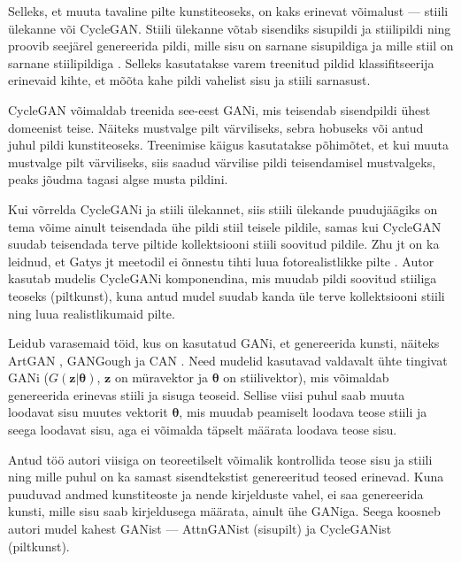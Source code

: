 \documentclass{vilgym}
\begin{document}
	Selleks, et muuta tavaline pilte kunstiteoseks, on kaks erinevat võimalust --- stiili ülekanne või CycleGAN. Stiili ülekanne võtab sisendiks sisupildi ja stiilipildi ning proovib seejärel genereerida pildi, mille sisu on sarnane sisupildiga ja mille stiil on sarnane stiilipildiga \parencite{styletransfer}.
	Selleks kasutatakse varem treenitud pildid klassifitseerija erinevaid kihte, et mõõta kahe pildi vahelist sisu ja stiili sarnasust. 

	CycleGAN võimaldab treenida see-eest GANi, mis teisendab sisendpildi ühest domeenist teise. Näiteks mustvalge pilt värviliseks, sebra hobuseks või antud juhul pildi kunstiteoseks. Treenimise käigus kasutatakse põhimõtet, et kui muuta mustvalge pilt värviliseks, siis saadud värvilise pildi teisendamisel mustvalgeks, peaks jõudma tagasi algse musta pildini. \parencite{cyclegan}

	Kui võrrelda CycleGANi ja stiili ülekannet, siis stiili ülekande puudujäägiks on tema võime ainult teisendada ühe pildi stiil teisele pildile, samas kui CycleGAN suudab teisendada terve piltide kollektsiooni stiili soovitud pildile. Zhu jt on ka leidnud, et Gatys jt meetodil ei õnnestu tihti luua fotorealistlikke pilte \parencite{cyclegan}. Autor kasutab mudelis CycleGANi komponendina, mis muudab pildi soovitud stiiliga teoseks (pilt\textrightarrow kunst), kuna antud mudel suudab kanda üle terve kollektsiooni stiili ning luua realistlikumaid pilte.

	Leidub varasemaid töid, kus on kasutatud GANi, et genereerida kunsti, näiteks ArtGAN \parencite{artgan}, GANGough \parencite{gangough} ja CAN \parencite{can}. Need mudelid kasutavad valdavalt ühte tingivat GANi ($ G(\boldsymbol{z}|\boldsymbol{\theta}) $, $ \boldsymbol{z} $ on müravektor ja $ \boldsymbol{\theta} $ on stiilivektor), mis võimaldab genereerida erinevas stiili ja sisuga teoseid. Sellise viisi puhul saab muuta loodavat sisu muutes vektorit $ \boldsymbol{\theta} $, mis muudab peamiselt loodava teose stiili ja seega loodavat sisu, aga ei võimalda täpselt määrata loodava teose sisu. 

	Antud töö autori viisiga on teoreetilselt võimalik kontrollida teose sisu ja stiili ning mille puhul on ka samast sisendtekstist genereeritud teosed erinevad. Kuna puuduvad andmed kunstiteoste ja nende kirjelduste vahel, ei saa genereerida kunsti, mille sisu saab kirjeldusega määrata, ainult ühe GANiga. Seega koosneb autori mudel kahest GANist --- AttnGANist (sisu\textrightarrow pilt) ja CycleGANist (pilt\textrightarrow kunst). %
\end{document}
